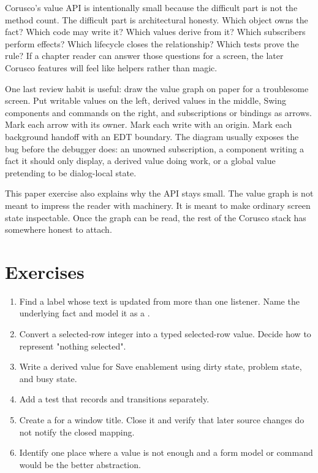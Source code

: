 Corusco's value API is intentionally small because the difficult part is not the
method count. The difficult part is architectural honesty. Which object owns the
fact? Which code may write it? Which values derive from it? Which subscribers
perform effects? Which lifecycle closes the relationship? Which tests prove the
rule? If a chapter reader can answer those questions for a screen, the later
Corusco features will feel like helpers rather than magic.

One last review habit is useful: draw the value graph on paper for a troublesome
screen. Put writable values on the left, derived values in the middle, Swing
components and commands on the right, and subscriptions or bindings as arrows.
Mark each arrow with its owner. Mark each write with an origin. Mark each
background handoff with an EDT boundary. The diagram usually exposes the bug
before the debugger does: an unowned subscription, a component writing a fact it
should only display, a derived value doing work, or a global value pretending to
be dialog-local state.

This paper exercise also explains why the API stays small. The value graph is
not meant to impress the reader with machinery. It is meant to make ordinary
screen state inspectable. Once the graph can be read, the rest of the Corusco
stack has somewhere honest to attach.

\section{Exercises}

\begin{exercisebox}
\begin{enumerate}
\item Find a label whose text is updated from more than one listener. Name the
underlying fact and model it as a .
\item Convert a selected-row integer into a typed selected-row value. Decide how
to represent "nothing selected".
\item Write a derived value for Save enablement using dirty state, problem
state, and busy state.
\item Add a test that records  and
 transitions separately.
\item Create a  for a window title. Close it and verify that
later source changes do not notify the closed mapping.
\item Identify one place where a value is not enough and a form model or command
would be the better abstraction.
\end{enumerate}
\end{exercisebox}

